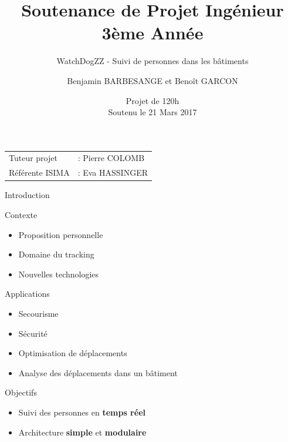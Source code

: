 \documentclass{beamer} %
\author{Benjamin BARBESANGE et Benoît GARCON}
\title{Soutenance de Projet Ingénieur 3ème Année}
\subtitle{WatchDogZZ - Suivi de personnes dans les bâtiments}
\date{Projet de 120h\\Soutenu le 21 Mars 2017}
\begin{document}
	\begin{frame} %
		\maketitle
    \vspace*{1cm}
    \footnotesize
    \begin{tabular}{ll}
      Tuteur projet &: Pierre COLOMB\\
      Référente ISIMA &: Eva HASSINGER
    \end{tabular}
	\end{frame}


  \begin{frame}{Introduction}
    
    \begin{block}{Contexte}
      \begin{itemize}
        \item Proposition personnelle
        \item Domaine du tracking
        \item Nouvelles technologies
      \end{itemize}
    \end{block}

    \pause

    \begin{exampleblock}{Applications}
      \begin{itemize}
        \item Secourisme
        \item Sécurité
        \item Optimisation de déplacements
        \item Analyse des déplacements dans un bâtiment
      \end{itemize}
    \end{exampleblock}

    \pause

    \begin{alertblock}{Objectifs}
      \begin{itemize}
        \item Suivi des personnes en \textbf{temps réel}
        \item Architecture \textbf{simple} et \textbf{modulaire}
      \end{itemize}
    \end{alertblock}

  \end{frame}
\end{document}
